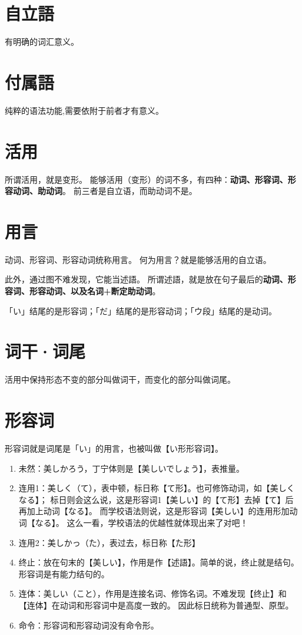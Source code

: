 \section{自立語}

有明确的词汇意义。

\section{付属語}

纯粹的语法功能,需要依附于前者才有意义。

\section{活用}

所谓活用，就是变形。
能够活用（变形）的词不多，有四种：\textbf{动词、形容词、形容动词、助动词}。
前三者是自立语，而助动词不是。

\section{用言}

动词、形容词、形容动词统称用言。
何为用言？就是能够活用的自立语。

此外，通过图不难发现，它能当述語。
所谓述語，就是放在句子最后的\textbf{动词、形容词、形容动词、以及名词+断定助动词}。

「い」结尾的是形容词；「だ」结尾的是形容动词；「ウ段」结尾的是动词。

\section{词干·词尾}

活用中保持形态不变的部分叫做词干，而变化的部分叫做词尾。

\section{形容词}

形容词就是词尾是「い」的用言，也被叫做【い形形容词】。

\begin{enumerate}
    \item 未然：美しかろう，丁宁体则是【美しいでしょう】，表推量。
    \item 连用1：美しく（て），表中顿，标日称【て形】。也可修饰动词，如【美しくなる】；
          标日则会这么说，这是形容词1【美しい】的【て形】去掉【て】后再加上动词【なる】。
          而学校语法则说，这是形容词【美しい】的连用形加动词【なる】。
          这么一看，学校语法的优越性就体现出来了对吧！
    \item 连用2：美しかっ（た），表过去，标日称【た形】
    \item 终止：放在句末的【美しい】，作用是作【述語】。简单的说，终止就是结句。形容词是有能力结句的。
    \item 连体：美しい（こと），作用是连接名词、修饰名词。不难发现【终止】和【连体】在动词和形容词中是高度一致的。
          因此标日统称为普通型、原型。
    \item 命令：形容词和形容动词没有命令形。
\end{enumerate}

